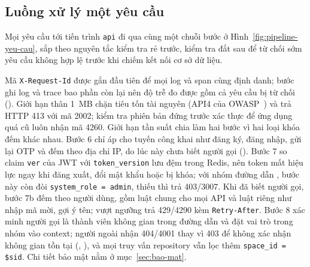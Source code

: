 \subsection{Luồng xử lý một yêu cầu}\label{ssec:luong-yeu-cau}

Mọi yêu cầu tới tiến trình \texttt{api} đi qua cùng một chuỗi bước ở Hình~\ref{fig:pipeline-yeu-cau}, sắp theo nguyên tắc kiểm tra rẻ trước, kiểm tra đắt sau để từ chối sớm yêu cầu không hợp lệ trước khi chiếm kết nối cơ sở dữ liệu.


Mã \texttt{X-Request-Id} được gắn đầu tiên để mọi log và span cùng định danh; bước ghi log và trace bao phần còn lại nên độ trễ đo được gồm cả yêu cầu bị từ chối (). Giới hạn thân 1~MB chặn tiêu tốn tài nguyên (API4 của OWASP~\cite{owaspapi}) và trả HTTP 413 với mã 2002; kiểm tra phiên bản đứng trước xác thực để ứng dụng quá cũ luôn nhận mã 4260. Giới hạn tần suất chia làm hai bước vì hai loại khóa đếm khác nhau. Bước 6 chỉ áp cho tuyến công khai như đăng ký, đăng nhập, gửi lại OTP và đếm theo địa chỉ IP, do lúc này chưa biết người gọi (). Bước 7 so claim \texttt{ver} của JWT với \texttt{token\_version} lưu đệm trong Redis, nên token mất hiệu lực ngay khi đăng xuất, đổi mật khẩu hoặc bị khóa; với nhóm đường dẫn , bước này còn đòi \texttt{system\_role = admin}, thiếu thì trả 403/3007. Khi đã biết người gọi, bước 7b đếm theo người dùng, gồm luật chung cho mọi API và luật riêng như nhập mã mời, gợi ý tên; vượt ngưỡng trả 429/4290 kèm \texttt{Retry-After}. Bước 8 xác minh người gọi là thành viên không gian trong đường dẫn và đặt vai trò trong nhóm vào context; người ngoài nhận 404/4001 thay vì 403 để không xác nhận không gian tồn tại (, ), và mọi truy vấn repository vẫn lọc thêm \texttt{space\_id = \$sid}. Chi tiết bảo mật nằm ở mục~\ref{sec:bao-mat}.

